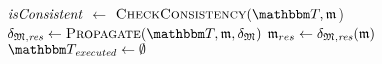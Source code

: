
    \begin{algorithmic}[1]
            \State $\mathit{isConsistent}$ $\leftarrow$ $\function{CheckConsistency}(\transformationset{T}, \modeltuple{m}$)
                \State \Return{$\bot$} \label{algo:orchestration:provenance:line:bot_input}
            \EndIf
            \State $\changetuple{\metamodeltuple{M},\mathvariable{res}} \gets %
            \function{Propagate}(\transformationset{T}, \modeltuple{m}, \changetuple{\metamodeltuple{M}})$
                \State \Return{$\bot$} \label{algo:orchestration:provenance:line:bot_orchestration}
            \EndIf
            \State $\mathfrak{m}_{res} \leftarrow \mathfrak{\delta}_{\mathfrak{M},\mathit{res}}(\mathfrak{m})$
            \State {} \label{algo:orchestration:provenance:line:return_result}
        \EndProcedure
        \vspace{\baselineskip}
            \vspace{0.15\baselineskip}
            \State $\provalgexecuted \gets \emptyset$ \label{algo:orchestration:provenance:line:executed_init}
            \vspace{0.3\baselineskip}
            

\end{algorithmic}

